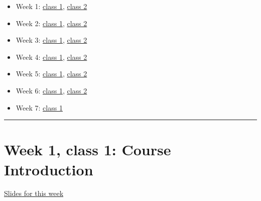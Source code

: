\documentclass[
]{book}
\begin{document}
\begin{itemize}
\item
  Week 1: \href{https://comhis.github.io/applying-network-analysis-to-humanities/slides/1-1-introduction.html}{class
  1},
  \href{https://comhis.github.io/applying-network-analysis-to-humanities/slides/1-2-intro-to-r.html}{class
  2}
\item
  Week 2: \href{https://comhis.github.io/applying-network-analysis-to-humanities/slides/2-1-network-data.html}{class
  1},
  \href{https://comhis.github.io/applying-network-analysis-to-humanities/slides/2-2-data-cleaning.html}{class
  2}
\item
  Week 3: \href{https://comhis.github.io/applying-network-analysis-to-humanities/slides/3-1-fundamentals-data-modelling.html}{class
  1},
  \href{https://comhis.github.io/applying-network-analysis-to-humanities/slides/3-2-building-data-model.html}{class
  2}
\item
  Week 4: \href{https://comhis.github.io/applying-network-analysis-to-humanities/slides/4-1-fundamentals.html}{class
  1},
  \href{https://comhis.github.io/applying-network-analysis-to-humanities/slides/4-2-networks-with-r.html}{class
  2}
\item
  Week 5: \href{https://comhis.github.io/applying-network-analysis-to-humanities/slides/5-1-visualising-with-ggraph.html}{class
  1},
  \href{https://comhis.github.io/applying-network-analysis-to-humanities/slides/visualising-gephi.html}{class
  2}
\item
  Week 6: \href{https://comhis.github.io/applying-network-analysis-to-humanities/slides/bipartite-networks.html}{class
  1},
  \href{https://comhis.github.io/applying-network-analysis-to-humanities/slides/6-2-literary-linguistic.html}{class
  2}
\item
  Week 7: \href{https://comhis.github.io/applying-network-analysis-to-humanities/slides/7-reflections.html}{class
  1}
\end{itemize}

\begin{center}\rule{0.5\linewidth}{0.5pt}\end{center}

\hypertarget{week-1-class-1-course-introduction}{%
\chapter{Week 1, class 1: Course Introduction}\label{week-1-class-1-course-introduction}}

\href{https://comhis.github.io/applying-network-analysis-to-humanities/slides/1-1-introduction.html\#/title-slide}{Slides for this week}
\end{document}
